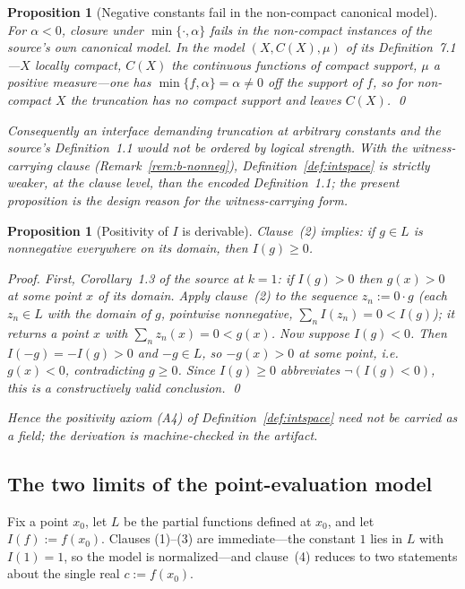 \documentclass[11pt]{article}
\newtheorem{proposition}[theorem]{Proposition}
\theoremstyle{definition}
\theoremstyle{remark}
\begin{document}
\begin{proposition}[Negative constants fail in the non-compact canonical model]
\label{prop:b-negcut}
For $\alpha<0$, closure under $\min\{\cdot,\alpha\}$ fails in the non-compact instances of the source's own canonical model.  In the model $(X,C(X),\mu)$ of its Definition~7.1---$X$ locally compact, $C(X)$ the continuous functions of compact support, $\mu$ a positive measure---one has $\min\{f,\alpha\}=\alpha\ne0$ off the support of $f$, so for non-compact $X$ the truncation has no compact support and leaves $C(X)$. \qed

Consequently an interface demanding truncation at arbitrary constants and the source's Definition~1.1 would not be ordered by logical strength.  With the witness-carrying clause (Remark~\ref{rem:b-nonneg}), Definition~\ref{def:intspace} is strictly weaker, at the clause level, than the encoded Definition~1.1; the present proposition is the design reason for the witness-carrying form.
\end{proposition}

\begin{proposition}[Positivity of $I$ is derivable]
\label{prop:b-inonneg}
Clause~(2) implies: if $g\in L$ is nonnegative everywhere on its domain, then $I(g)\ge0$.

\emph{Proof.}  First, Corollary~1.3 of the source at $k=1$: if $I(g)>0$ then $g(x)>0$ at some point $x$ of its domain.  Apply clause~(2) to the sequence $z_n:=0\cdot g$ (each $z_n\in L$ with the domain of $g$, pointwise nonnegative, $\sum_n I(z_n)=0<I(g)$); it returns a point $x$ with $\sum_n z_n(x)=0<g(x)$.  Now suppose $I(g)<0$.  Then $I(-g)=-I(g)>0$ and $-g\in L$, so $-g(x)>0$ at some point, i.e.\ $g(x)<0$, contradicting $g\ge0$.  Since $I(g)\ge0$ abbreviates $\neg(I(g)<0)$, this is a constructively valid conclusion. \qed

Hence the positivity axiom (A4) of Definition~\ref{def:intspace} need not be carried as a field; the derivation is machine-checked in the artifact.
\end{proposition}

\subsection{The two limits of the point-evaluation model}
\label{sec:b-dirac}

Fix a point $x_0$, let $L$ be the partial functions defined at $x_0$, and let $I(f):=f(x_0)$.  Clauses (1)--(3) are immediate---the constant $1$ lies in $L$ with $I(1)=1$, so the model is normalized---and clause~(4) reduces to two statements about the single real $c:=f(x_0)$.
\end{document}
